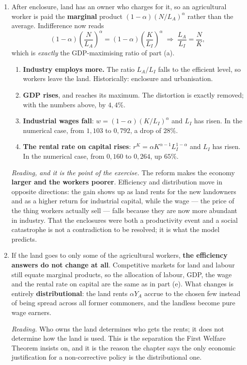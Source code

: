\documentclass[12pt, letterpaper]{article}
\begin{document}
\begin{tcolorbox}[oddbox,title={Problem 9.13 \quad The Enclosure Acts}]
\begin{enumerate}
\item After enclosure, land has an owner who charges for it, so an agricultural worker is paid
the \textbf{marginal} product $(1-\alpha)(N/L_A)^{\alpha}$ rather than the average. Indifference
now reads
\[
(1-\alpha)\left(\frac{N}{L_A}\right)^{\alpha}=(1-\alpha)\left(\frac{K}{L_I}\right)^{\alpha}
\;\Longrightarrow\;
\frac{L_A}{L_I}=\frac{N}{K},
\]
which is \emph{exactly} the GDP-maximising ratio of part (a).
\begin{enumerate}
\item \textbf{Industry employs more.} The ratio $L_A/L_I$ falls to the efficient level, so
workers leave the land. Historically: enclosure and urbanisation.
\item \textbf{GDP rises}, and reaches its maximum. The distortion is exactly removed; with the
numbers above, by $4{,}4\%$.
\item \textbf{Industrial wages fall}: $w=(1-\alpha)(K/L_I)^{\alpha}$ and $L_I$ has risen. In the
numerical case, from $1{,}103$ to $0{,}792$, a drop of $28\%$.
\item \textbf{The rental rate on capital rises}:
$r^K=\alpha K^{\alpha-1}L_I^{1-\alpha}$ and $L_I$ has risen. In the numerical case, from
$0{,}160$ to $0{,}264$, up $65\%$.
\end{enumerate}

\emph{Reading, and it is the point of the exercise.} The reform makes the economy
\textbf{larger and the workers poorer}. Efficiency and distribution move in opposite
directions: the gain shows up as land rents for the new landowners and as a higher return for
industrial capital, while the wage --- the price of the thing workers actually sell --- falls
because they are now more abundant in industry. That the enclosures were both a productivity
event and a social catastrophe is not a contradiction to be resolved; it is what the model
predicts.

\item If the land goes to only some of the agricultural workers, \textbf{the efficiency
answers do not change at all}. Competitive markets for land and labour still equate marginal
products, so the allocation of labour, GDP, the wage and the rental rate on capital are the
same as in part (e). What changes is entirely \textbf{distributional}: the land rents
$\alpha Y_A$ accrue to the chosen few instead of being spread across all former commoners, and
the landless become pure wage earners.

\emph{Reading.} Who owns the land determines who gets the rents; it does not determine how the
land is used. This is the separation the First Welfare Theorem insists on, and it is the reason
the chapter says the only economic justification for a non-corrective policy is the
distributional one.
\end{enumerate}
\end{tcolorbox}
\end{document}
